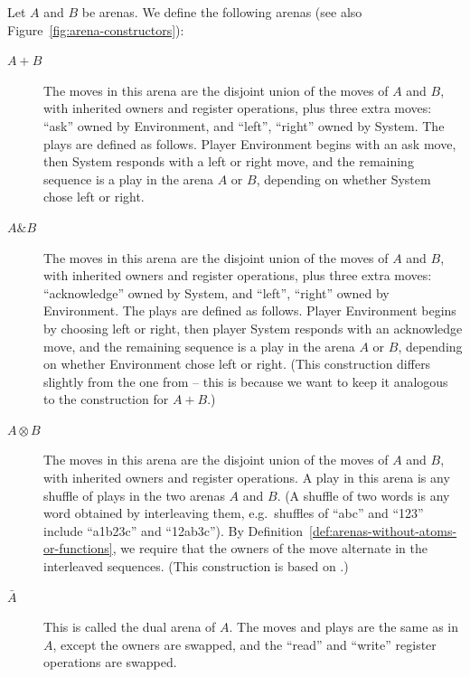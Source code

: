\documentclass[10pt,a4paper]{amsart}
\numberwithin{equation}{section}
\theoremstyle{plain}
\begin{document}
\begin{definition}\label{def:composition-of-arenas}
    Let  $A$ and $B$ be arenas. We define the following arenas (see also Figure~\ref{fig:arena-constructors}):
        \begin{description}
            \item[$A+B$] The moves in this arena are the disjoint union of the moves of $A$ and $B$, with inherited owners and register operations, plus three extra moves: ``ask'' owned by Environment, and ``left'', ``right'' owned by System. 
            The plays are defined as follows. Player Environment begins with  an ask move, then System responds with a left or right move, and the remaining sequence is a play in the arena $A$ or $B$, depending on whether System chose left or right. 
            \item[$A \& B$] The moves in this arena are the disjoint union of the moves of $A$ and $B$, with inherited owners and register operations, plus three extra moves: ``acknowledge'' owned by System, and ``left'', ``right'' owned by Environment. 
            The plays are defined as follows. Player Environment begins by choosing left or right, then player System responds with an acknowledge move, and the remaining sequence is a play  in the arena $A$ or $B$, depending on whether Environment chose left or right.
            (This construction differs slightly from the one from \cite[Excercise~1.10]{abramsky2013semantics} -- this is because we want to keep it analogous to the construction for $A + B$.)
            \item[$A \otimes B$] The moves in this arena are the disjoint union of the moves of $A$ and $B$, with inherited owners and register operations. A play in this arena is any shuffle of plays in the two arenas $A$ and $B$. (A shuffle of two words is any word obtained by interleaving them, e.g.~shuffles of ``abc'' and ``123'' include ``a1b23c'' and ``12ab3c'').
            By Definition~\ref{def:arenas-without-atoms-or-functions}, we require that the owners of the move alternate in the 
            interleaved sequences. (This construction is based on \cite[p.7]{abramsky2013semantics}.) 
            

            \item[$\bar A$] This is called the dual arena of $A$. The moves and plays are the same as in $A$, except the owners are swapped, and the ``read'' and ``write'' register operations are swapped.
        \end{description} 
\end{definition}
\end{document}
